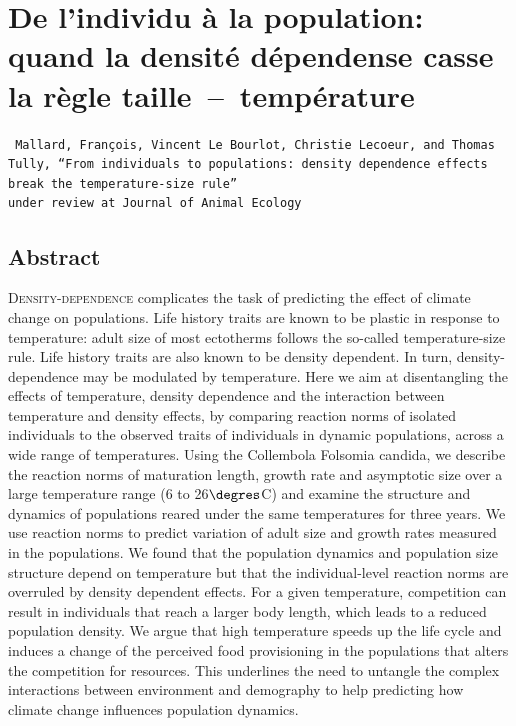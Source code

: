 \chapter[De l'individu à la population: quand la densité dépendense casse la
règle taille~--~température][Densité dépendence et température]{De l'individu à la population: quand la densité dépendense casse la
règle taille~--~température}

\vspace{2cm}

\texttt{
Mallard, François, Vincent Le Bourlot, Christie Lecoeur, and Thomas Tully, ``From
individuals to populations:
density dependence effects break the temperature-size rule''\\
under review at Journal of Animal Ecology
}

\section*{Abstract}

\lettrine[lines=3]{D}{ensity-dependence} complicates the task of predicting the
effect of climate change on populations. Life history traits are known to be plastic in response
to temperature: adult size of most ectotherms follows the so-called
temperature-size rule. Life history traits are also known to be density
dependent. In turn, density-dependence may be modulated by temperature. Here we
aim at disentangling the effects of temperature, density dependence and the
interaction between temperature and density effects, by comparing reaction norms
of isolated individuals to the observed traits of individuals in dynamic
populations, across a wide range of temperatures. Using the Collembola Folsomia
candida, we describe the reaction norms of maturation length, growth rate and
asymptotic size over a large temperature range (6 to 26$\degres$C) and examine
the structure and dynamics of populations reared under the same temperatures for
three years. We use reaction norms to predict variation of adult size and growth
rates measured in the populations. We found that the population dynamics and
population size structure depend on temperature but that the individual-level
reaction norms are overruled by density dependent effects. For a given
temperature, competition can result in individuals that reach a larger body
length, which leads to a reduced population density. We argue that high
temperature speeds up the life cycle and induces a change of the perceived food
provisioning in the populations that alters the competition for resources. This
underlines the need to untangle the complex interactions between environment and
demography to help predicting how climate change influences population dynamics.

